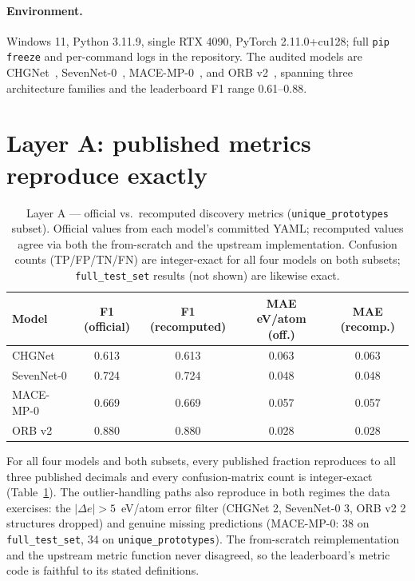 \documentclass[11pt]{article}
\newcommand{\code}[1]{\texttt{#1}}
\begin{document}
\paragraph{Environment.} Windows 11, Python 3.11.9, single RTX 4090,
PyTorch 2.11.0+cu128; full \code{pip freeze} and per-command logs in the
repository. The audited models are CHGNet~\cite{deng2023},
SevenNet-0~\cite{park2024}, MACE-MP-0~\cite{batatia2024}, and
ORB v2~\cite{neumann2024}, spanning three architecture families and the
leaderboard F1 range 0.61--0.88.

\section{Layer A: published metrics reproduce exactly}

\begin{table}[t]
\centering
\small
\caption{Layer A --- official vs.\ recomputed discovery metrics
(\code{unique\_prototypes} subset). Official values from each model's
committed YAML; recomputed values agree via both the from-scratch and the
upstream implementation. Confusion counts (TP/FP/TN/FN) are integer-exact for
all four models on both subsets; \code{full\_test\_set} results (not shown)
are likewise exact.}
\label{tab:layer-a}
\begin{tabular}{lcccc}
\toprule
Model & F1 (official) & F1 (recomputed) & MAE eV/atom (off.) & MAE (recomp.) \\
\midrule
CHGNet     & 0.613 & 0.613 & 0.063 & 0.063 \\
SevenNet-0 & 0.724 & 0.724 & 0.048 & 0.048 \\
MACE-MP-0  & 0.669 & 0.669 & 0.057 & 0.057 \\
ORB v2     & 0.880 & 0.880 & 0.028 & 0.028 \\
\bottomrule
\end{tabular}
\end{table}

For all four models and both subsets, every published fraction reproduces to
all three published decimals and every confusion-matrix count is
integer-exact (Table~\ref{tab:layer-a}). The outlier-handling paths also
reproduce in both regimes the data exercises: the $|\Delta e| > 5$~eV/atom
error filter (CHGNet 2, SevenNet-0 3, ORB v2 2 structures dropped) and
genuine missing predictions (MACE-MP-0: 38 on \code{full\_test\_set}, 34 on
\code{unique\_prototypes}). The from-scratch reimplementation and the upstream
metric function never disagreed, so the leaderboard's metric code is faithful
to its stated definitions.
\end{document}
